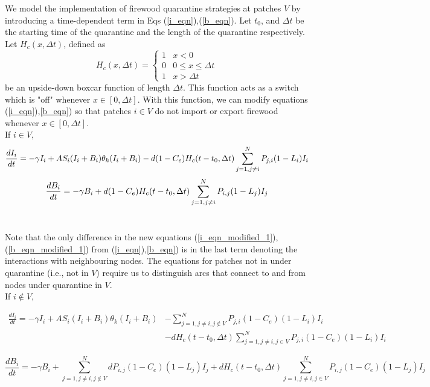  We model the implementation of firewood quarantine strategies at patches $V$ by introducing a time-dependent term in Eqs (\ref{i_eqn}),(\ref{b_eqn}). Let $t_0$, and $\Delta t$ be the starting time of the quarantine and the length of the quarantine respectively. Let $H_c(x,\Delta t)$, defined as
$$H_c(x,\Delta t) = 
\begin{cases} 
      1 & x<0 \\
      0 & 0\leq x\leq \Delta t \\
      1 & x > \Delta t
\end{cases}
$$
be an upside-down boxcar function of length $\Delta t$. This function acts as a switch which is "off" whenever $x \in [0,\Delta t]$. With this function, we can modify equations (\ref{i_eqn}),\ref{b_eqn}) so that patches $i\in V$ do not import or export firewood whenever $x \in [0,\Delta t]$.
\newline\\
If $i \in V$,
\footnotesize{
\begin{equation}
\frac{d I_i}{dt} = -\gamma I_i+ A S_i (I_i+ B_i)\theta_k(I_i+ B_i)- d (1 - C_e)H_c(t - t_0,\Delta t)\sum_{j = 1, j\neq i}^N P_{j,i} (1 - L_i)I_i
\protect \label{i_eqn_modified_1}
\end{equation}
\begin{equation}
\frac{d B_i}{dt} = -\gamma B_i+d (1 - C_e)H_c(t - t_0,\Delta t)\sum_{j = 1, j\neq i}^N P_{i,j} (1 - L_j)I_j
\protect \label{b_eqn_modified_1}
\end{equation}}
\newline\\
\normalsize

Note that the only difference in the new equations (\ref{i_eqn_modified_1}),(\ref{b_eqn_modified_1}) from (\ref{i_eqn}),\ref{b_eqn}) is in the last term denoting the interactions with neighbouring nodes. The equations for patches not in under quarantine (i.e., not in $V$) require us to distinguish arcs that connect to and from nodes under quarantine in $V$.
\newline\\
If $i \notin V$,
\footnotesize{
\begin{align}
\label{i_eqn_modified_2}
\frac{d I_i}{dt} = -\gamma I_i+ A S_i (I_i+ B_i)\theta_k(I_i+ B_i) &- \sum_{j = 1, j\neq i, j \notin V}^N P_{j,i} (1 - C_e) (1 - L_i)I_i\\ &-  dH_c(t - t_0,\Delta t)\sum_{j = 1, j\neq i, j \in V}^N P_{j,i} (1 - C_e) (1 - L_i)I_i \nonumber
\end{align}


\begin{equation}
\frac{d B_i}{dt} = -\gamma B_i+ \sum_{j = 1, j\neq i, j\notin V}^N d P_{i,j} (1 - C_e) (1 - L_j)I_j  +dH_c(t - t_0,\Delta t)\sum_{j = 1, j\neq i, j\in V}^N P_{i,j} (1 - C_e) (1 - L_j)I_j 
\label{b_eqn_modified_2}
\end{equation}}
\normalsize

